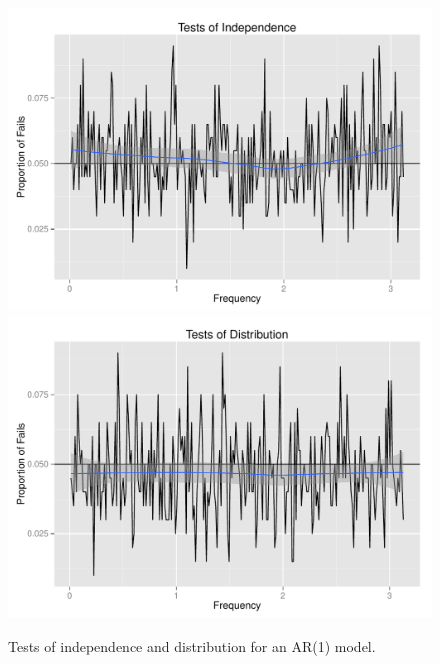 \documentclass{article}\usepackage[]{graphicx}\usepackage[]{color}
\newenvironment{knitrout}{}{} %
\theoremstyle{plain}
\begin{document}
\begin{knitrout}
\color{fgcolor}\begin{figure}[H]

\includegraphics[width=.49\textwidth]{figure/tests-ar11} 
\includegraphics[width=.49\textwidth]{figure/tests-ar12} \caption[Tests of independence and distribution for an AR(1) model]{Tests of independence and distribution for an AR(1) model.\label{fig:tests-ar1}}
\end{figure}


\end{knitrout}
\end{document}
